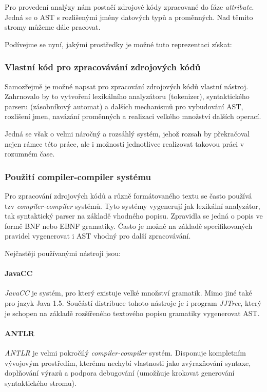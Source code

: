 Pro provedení analýzy nám postačí zdrojové kódy zpracované do fáze \emph{attribute}. Jedná se o AST s rozlišenými jmény datových typů a proměnných. Nad těmito stromy můžeme dále pracovat.

Podívejme se nyní, jakými prostředky je možné tuto reprezentaci získat:

\subsubsection{Vlastní kód pro zpracovávání zdrojových kódů}
Samozřejmě je možné napsat pro zpracování zdrojových kódů vlastní nástroj. Zahrnovalo by to vytvoření lexikálního analyzátoru (tokenizer), syntaktického parseru (zásobníkový automat) a dalších mechanismů pro vybudování AST, rozlišení jmen, navázání proměnných a realizaci velkého množství dalších operací.

Jedná se však o velmi náročný a rozsáhlý systém, jehož rozsah by překračoval nejen rámec této práce, ale i možnosti jednotlivce realizovat takovou práci v rozumném čase.

\subsubsection{Použití compiler-compiler systému}
Pro zpracování zdrojových kódů a různě formátovaného textu se často používá tzv \emph{compiler-compiler} systémů. Tyto systémy vygenerují jak lexikální analyzátor, tak syntaktický parser na základě vhodného popisu. Zpravidla se jedná o popis ve formě BNF nebo EBNF gramatiky. Často je možné na základě specifikovaných pravidel vygenerovat i AST vhodný pro další zpracovávání.

Nejčastěji používanými nástroji jsou:

\paragraph{JavaCC} \emph{JavaCC} \cite{parsertools:javacc} je systém, pro který existuje velké množství gramatik. Mimo jiné také pro jazyk Java 1.5. Součástí distribuce tohoto nástroje je i program \emph{JJTree}, který je schopen na základě rozšířeného textového popisu gramatiky vygenerovat AST.

\paragraph{ANTLR} \emph{ANTLR} \cite{parsertools:antlr} je velmi pokročilý \emph{compiler-compiler} systém. Disponuje kompletním vývojovým prostředím, kterému nechybí vlastnosti jako zvýrazňování syntaxe, doplňování výrazů a podpora debugování (umožňuje krokovat generování syntaktického stromu).

